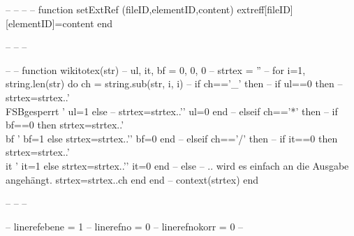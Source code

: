 --%
--%
--%
--%
function setExtRef (fileID,elementID,content)
	extreff[fileID][elementID]=content
end

--%
--%
--%

--%
--%
function wikitotex(str)
	--%
	ul, it, bf = 0, 0, 0
	--%
	strtex = ''
	--%
	for i=1, string.len(str) do
		ch = string.sub(str, i, i)
		--%
		if ch=='_' then
			--%
			if ul==0 then
				--%
				strtex=strtex..'\\FSBgesperrt{ '
				ul=1
			else
				--%
				strtex=strtex..'}'
				ul=0
			end
		--%
		elseif ch=='*' then
			--%
			if bf==0 then
				strtex=strtex..'{\\bf '
				bf=1
			else
				strtex=strtex..'}'
				bf=0
			end
		--%
		elseif ch=='/' then
			--%
			if it==0 then
				strtex=strtex..'{\\it '
				it=1
			else
				strtex=strtex..'}'
				it=0
			end
		--%
		else
			-- .. wird es einfach an die Ausgabe angehängt.
			strtex=strtex..ch
		end
	end
	--%
	context(strtex)
end

--%
--%
--%

--%
linerefebene = 1 --%
linerefno = 0 --%
linerefnokorr = {0} --%

